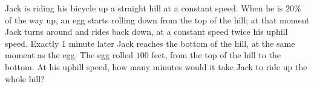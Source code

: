 Jack is riding his bicycle up a straight hill at a constant speed. When he is $20\%$ of the way up, an egg starts rolling down from the top of the hill; at that moment Jack turns around and rides back down, at a constant speed twice his uphill speed. Exactly $1$ minute later Jack reaches the bottom of the hill, at the same moment as the egg. The egg rolled $100$ feet, from the top of the hill to the bottom. At his uphill speed, how many minutes would it take Jack to ride up the whole hill?
